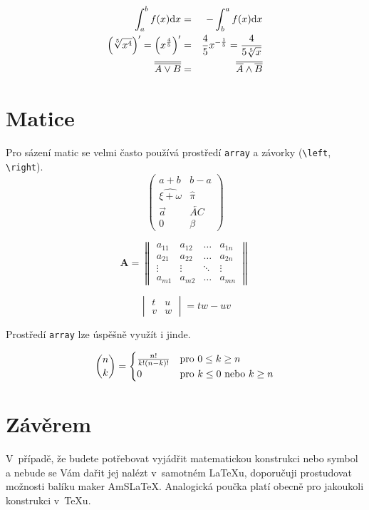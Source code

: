 \documentclass[a4paper, 11pt]{article}
\theoremstyle{definition}
\theoremstyle{theorem}
\begin{document}
\begin{eqnarray}
\int_{a}^{b}f(x)\textup{d}x  &=& - \int_{b}^{a}f(x)\textup{d}x\\
\left(\sqrt[5]{x^4}\right)^\prime=\left(x^{\frac{4}{5}}\right)^\prime &=&\frac{4}{5}x^{-\frac{1}{5}}=\frac{4}{5\sqrt[5]{x}}\\
\overline{\overline{A\vee B}}&=&\overline{\overline{A}\wedge\overline{B}}
\end{eqnarray}

\section{ Matice}

Pro sázení matic se velmi často používá prostředí {\tt array} a závorky (\verb!\left!, \verb!\right!).\pagebreak
\begin{equation*}
\begin{pmatrix}
a+b & b-a\\
\widehat{\xi+\omega} & \hat{\pi}\\
\vec{a} & \overleftarrow{AC}\\
0 & \beta
\end{pmatrix}
\end{equation*}

\begin{equation*}
\textbf{A}=
\begin{Vmatrix}
a_{11} & a_{12} &\dots & a_{1n}\\
a_{21} & a_{22} &\dots & a_{2n}\\
\vdots & \vdots & \ddots & \vdots\\
a_{m1} & a_{m2} &\dots & a_{mn}
\end{Vmatrix}
\end{equation*}

\begin{equation*}
\begin{vmatrix}
t&u\\
v & w
\end{vmatrix}
=tw -uv
\end{equation*}

Prostředí {\tt array} lze úspěšně využít i jinde.

\begin{equation*}
\binom{n}{k} = \begin{cases}
\frac{n!}{k!(n-k)!} & \textup{pro }  0 \leq  k \geq n \\
0 & \text{pro }  k \le 0 \ \textup{nebo }  k \ge n
\end{cases}
\end{equation*}

\section{Závěrem}

V~případě, že budete potřebovat vyjádřit matematickou konstrukci nebo symbol a nebude se Vám dařit jej nalézt v~samotném LaTeXu, doporučuji prostudovat možnosti balíku maker AmSLaTeX.
Analogická poučka platí obec\-ně pro jakoukoli konstrukci v~TeXu.
\end{document}
